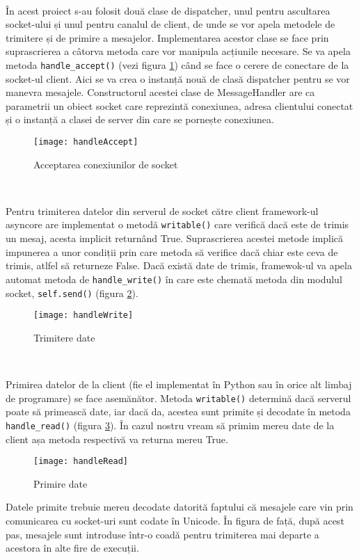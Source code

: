 \documentclass[../IoMusT.tex]{subfiles}
\begin{document}
\\
\par În acest proiect s-au folosit două clase de dispatcher, unul pentru ascultarea socket-ului și unul pentru canalul de client, de unde se vor apela metodele de trimitere și de primire a mesajelor. Implementarea acestor clase se face prin suprascrierea a câtorva metoda care vor manipula acțiunile necesare. Se va apela metoda \verb|handle_accept()| (vezi figura \ref{fig:accept}) când se face o cerere de conectare de la socket-ul client. Aici se va crea o instanță nouă de clasă dispatcher pentru se vor manevra mesajele. Constructorul acestei clase de MessageHandler are ca parametrii un obiect socket care reprezintă conexiunea, adresa clientului conectat și o instanță a clasei de server din care se pornește conexiunea.
\begin{figure}[h]
\centering
\texttt{[image: handleAccept]}
\caption{Acceptarea conexiunilor de socket}
\label{fig:accept}
\end{figure}
\\
\par Pentru trimiterea datelor din serverul de socket către client framework-ul asyncore are implementat o metodă \verb|writable()| care verifică dacă este de trimis un mesaj, acesta implicit returnând True. Suprascrierea acestei metode implică impunerea a unor condiții prin care metoda să verifice dacă chiar este ceva de trimis, atlfel să returneze False. Dacă există date de trimis, framewok-ul va apela automat metoda de \verb|handle_write()| în care este chemată metoda din modulul socket, \verb|self.send()| (figura \ref{fig:write}).
\begin{figure}[h]
\centering
\texttt{[image: handleWrite]}
\caption{Trimitere date}
\label{fig:write}
\end{figure}
\\
\par Primirea datelor de la client (fie el implementat în Python sau în orice alt limbaj de programare) se face asemănător. Metoda \verb|writable()| determină dacă serverul poate să primească date, iar dacă da, acestea sunt primite și decodate în metoda \verb|handle_read()| (figura \ref{fig:read}). În cazul nostru vream să primim mereu date de la client așa metoda respectivă va returna mereu True.
\begin{figure}[h]
\centering
\texttt{[image: handleRead]}
\caption{Primire date}
\label{fig:read}
\end{figure}
Datele primite trebuie mereu decodate datorită faptului că mesajele care vin prin comunicarea cu socket-uri sunt codate în Unicode. În figura de față, după acest pas, mesajele sunt introduse într-o coadă pentru trimiterea mai departe a acestora în alte fire de execuții.
\end{document}
